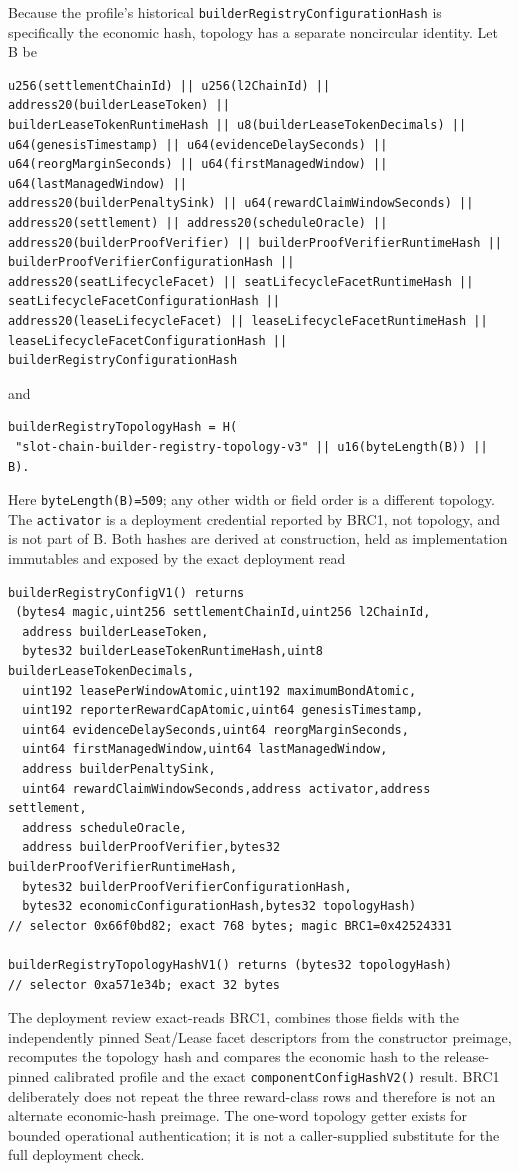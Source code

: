 \documentclass[a4paper,11pt]{article}
\newcommand{\code}[1]{\nolinkurl{#1}}
\begin{document}
Because the profile's historical \code{builderRegistryConfigurationHash} is
specifically the economic hash, topology has a separate noncircular identity.
Let B be
\begin{verbatim}
u256(settlementChainId) || u256(l2ChainId) ||
address20(builderLeaseToken) ||
builderLeaseTokenRuntimeHash || u8(builderLeaseTokenDecimals) ||
u64(genesisTimestamp) || u64(evidenceDelaySeconds) ||
u64(reorgMarginSeconds) || u64(firstManagedWindow) ||
u64(lastManagedWindow) ||
address20(builderPenaltySink) || u64(rewardClaimWindowSeconds) ||
address20(settlement) || address20(scheduleOracle) ||
address20(builderProofVerifier) || builderProofVerifierRuntimeHash ||
builderProofVerifierConfigurationHash ||
address20(seatLifecycleFacet) || seatLifecycleFacetRuntimeHash ||
seatLifecycleFacetConfigurationHash ||
address20(leaseLifecycleFacet) || leaseLifecycleFacetRuntimeHash ||
leaseLifecycleFacetConfigurationHash || builderRegistryConfigurationHash
\end{verbatim}
and
\begin{verbatim}
builderRegistryTopologyHash = H(
 "slot-chain-builder-registry-topology-v3" || u16(byteLength(B)) || B).
\end{verbatim}
Here \code{byteLength(B)=509}; any other width or field order is a different
topology.  The \code{activator} is a deployment credential reported by BRC1,
not topology, and is not part of B.
Both hashes are derived at construction, held as implementation immutables and
exposed by the exact deployment read
\begin{verbatim}
builderRegistryConfigV1() returns
 (bytes4 magic,uint256 settlementChainId,uint256 l2ChainId,
  address builderLeaseToken,
  bytes32 builderLeaseTokenRuntimeHash,uint8 builderLeaseTokenDecimals,
  uint192 leasePerWindowAtomic,uint192 maximumBondAtomic,
  uint192 reporterRewardCapAtomic,uint64 genesisTimestamp,
  uint64 evidenceDelaySeconds,uint64 reorgMarginSeconds,
  uint64 firstManagedWindow,uint64 lastManagedWindow,
  address builderPenaltySink,
  uint64 rewardClaimWindowSeconds,address activator,address settlement,
  address scheduleOracle,
  address builderProofVerifier,bytes32 builderProofVerifierRuntimeHash,
  bytes32 builderProofVerifierConfigurationHash,
  bytes32 economicConfigurationHash,bytes32 topologyHash)
// selector 0x66f0bd82; exact 768 bytes; magic BRC1=0x42524331

builderRegistryTopologyHashV1() returns (bytes32 topologyHash)
// selector 0xa571e34b; exact 32 bytes
\end{verbatim}
The deployment review exact-reads BRC1, combines those fields with the
independently pinned Seat/Lease facet descriptors from the constructor
preimage, recomputes the topology hash and compares the economic hash to the
release-pinned calibrated profile and the exact \code{componentConfigHashV2()}
result.  BRC1 deliberately does not repeat the three reward-class rows and
therefore is not an alternate economic-hash preimage.  The one-word topology
getter exists for bounded operational authentication; it is not a
caller-supplied substitute for the full deployment check.
\end{document}
